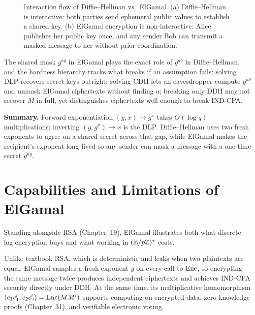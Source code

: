 \begin{figure}[htbp]
\caption{Interaction flow of Diffie--Hellman vs.\ ElGamal. (a) Diffie--Hellman is interactive: both parties send ephemeral public values to establish a shared key. (b) ElGamal encryption is non-interactive: Alice publishes her public key once, and any sender Bob can transmit a masked message to her without prior coordination.}
\label{ch20:fig-dh-vs-elgamal}
\end{figure}

The shared mask $g^{ay}$ in ElGamal plays the exact role of $g^{ab}$ in Diffie--Hellman, and the hardness hierarchy tracks what breaks if an assumption fails: solving DLP recovers secret keys outright; solving CDH lets an eavesdropper compute $g^{ab}$ and unmask ElGamal ciphertexts without finding $a$; breaking only DDH may not recover $M$ in full, yet distinguishes ciphertexts well enough to break IND-CPA.

\begin{focusbox}
\textbf{Summary.} Forward exponentiation $(g, x) \mapsto g^x$ takes $O(\log q)$ multiplications; inverting $(g, g^x) \mapsto x$ is the DLP. Diffie--Hellman uses two fresh exponents to agree on a shared secret across that gap, while ElGamal makes the recipient's exponent long-lived so any sender can mask a message with a one-time secret $g^{ay}$.
\end{focusbox}

\section{Capabilities and Limitations of ElGamal}
\label{ch20:roadmap}

Standing alongside RSA (Chapter~19), ElGamal illustrates both what discrete-log encryption buys and what working in $(\mathbb{Z}/p\mathbb{Z})^{*}$ costs.

\begin{whybox}
Unlike textbook RSA, which is deterministic and leaks when two plaintexts are equal, ElGamal samples a fresh exponent $y$ on every call to $\operatorname{Enc}$, so encrypting the same message twice produces independent ciphertexts and achieves IND-CPA security directly under DDH. At the same time, its multiplicative homomorphism $(c_1 c_1', c_2 c_2') = \operatorname{Enc}(M M')$ supports computing on encrypted data, zero-knowledge proofs (Chapter~31), and verifiable electronic voting.
\end{whybox}

